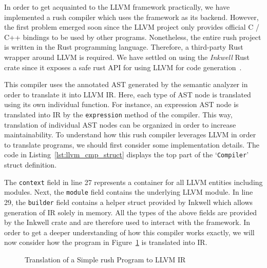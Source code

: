 In order to get acquainted to the LLVM framework practically, we have implemented a rush compiler which uses the framework as its backend.
However, the first problem emerged soon since the LLVM project only provides official C / C++ bindings to be used by other programs.
Nonetheless, the entire rush project is written in the Rust programming language.
Therefore, a third-party Rust wrapper around LLVM is required.
We have settled on using the \emph{Inkwell} Rust crate since it exposes a safe rust API for using LLVM for code generation~\cite{Inkwell2023}.

This compiler uses the annotated AST generated by the semantic analyzer in order to translate it into LLVM IR\@.
Here, each type of AST node is translated using its own individual function.
For instance, an expression AST node is translated into IR by the \texttt{expression} method of the compiler.
This way, translation of individual AST nodes can be organized in order to increase maintainability.
To understand how this rush compiler leverages LLVM in order to translate programs, we should first consider some implementation details.
The code in Listing~\ref{lst:llvm_cmp_struct} displays the top part of the `\texttt{Compiler}' struct definition.


The \texttt{context} field in line 27 represents a container for all LLVM entities including modules.
Next, the \texttt{module} field contains the underlying LLVM module.
In line 29, the \texttt{builder} field contains a helper struct provided by Inkwell which allows generation of IR solely in memory.
All the types of the above fields are provided by the Inkwell crate and are therefore used to interact with the framework.
In order to get a deeper understanding of how this compiler works exactly, we will now consider how the program in Figure~\ref{fig:llvm_simple} is translated into IR.

\noindent
\begin{figure}[h]
	\begin{minipage}{.5\textwidth}
		\centering
	\end{minipage}%
	\begin{minipage}{.5\textwidth}
		\centering
	\end{minipage}
	\caption{Translation of a Simple rush Program to LLVM IR}\label{fig:llvm_simple}
\end{figure}

